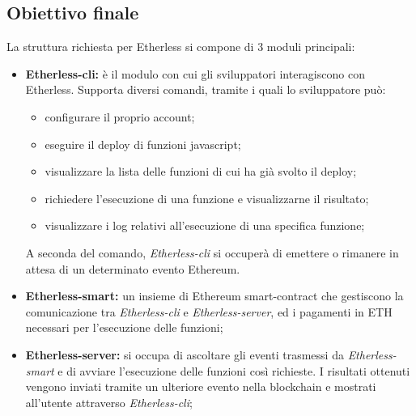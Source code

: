 \subsection{Obiettivo finale}
La struttura richiesta per Etherless si compone di 3 moduli principali: 
\begin{itemize}
	\item \textbf{Etherless-cli:} è il modulo con cui gli sviluppatori interagiscono con Etherless. Supporta diversi comandi, tramite i quali lo sviluppatore può: 
		\begin{itemize}
			\item configurare il proprio account; 
			\item eseguire il deploy di funzioni javascript; 
			\item visualizzare la lista delle funzioni di cui ha già svolto il deploy; 
			\item richiedere l'esecuzione di una funzione e visualizzarne il risultato; 
			\item visualizzare i log relativi all'esecuzione di una specifica funzione; 
		\end{itemize}  
	A seconda del comando, \textit{Etherless-cli} si occuperà di emettere o rimanere in attesa di un determinato evento Ethereum. 
	
	\item \textbf{Etherless-smart:} un insieme di Ethereum smart-contract che gestiscono la comunicazione tra \textit{Etherless-cli} e \textit{Etherless-server}, ed i pagamenti in ETH necessari per l'esecuzione delle funzioni; 
	\item \textbf{Etherless-server:} si occupa di ascoltare gli eventi trasmessi da \textit{Etherless-smart} e di avviare l'esecuzione delle funzioni così richieste. I risultati ottenuti vengono inviati tramite un ulteriore evento nella blockchain e mostrati all'utente attraverso \textit{Etherless-cli};  
\end{itemize}

